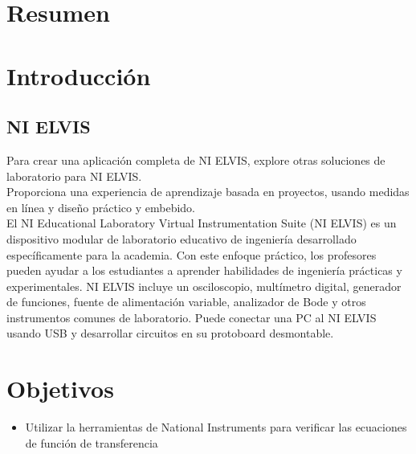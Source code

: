 \documentclass[]{article}
\begin{document}
	


\tableofcontents  %


\section{Resumen}

\section{Introducción}



\subsection{NI ELVIS}

Para crear una aplicación completa de NI ELVIS, explore otras soluciones de laboratorio para NI ELVIS.\\

Proporciona una experiencia de aprendizaje basada en proyectos, usando medidas en línea y diseño práctico y embebido.\\

El NI Educational Laboratory Virtual Instrumentation Suite (NI ELVIS) es un dispositivo modular de laboratorio educativo de ingeniería desarrollado específicamente para la academia. Con este enfoque práctico, los profesores pueden ayudar a los estudiantes a aprender habilidades de ingeniería prácticas y experimentales. NI ELVIS incluye un osciloscopio, multímetro digital, generador de funciones, fuente de alimentación variable, analizador de Bode y otros instrumentos comunes de laboratorio. Puede conectar una PC al NI ELVIS usando USB y desarrollar circuitos en su protoboard desmontable.\cite{NationalInstruments2018}\\

\section{Objetivos}


	\begin{itemize}
		\item Utilizar la herramientas de National Instruments para verificar las ecuaciones de función de transferencia
	\end{itemize}
\end{document}
